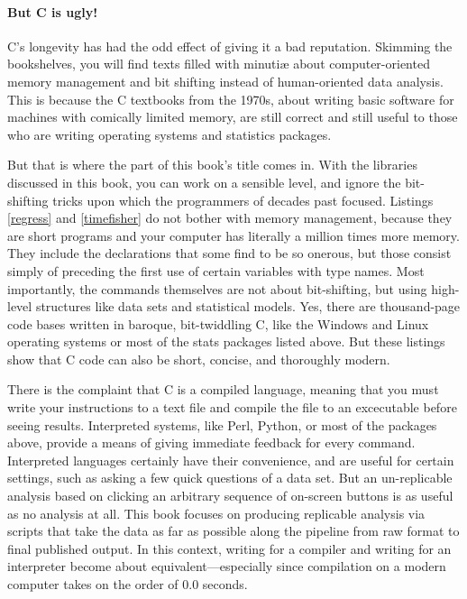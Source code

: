 \paragraph{But C is ugly!} C's longevity has had the odd effect of giving
it a bad reputation. Skimming the bookshelves, you will find texts
filled with minuti\ae{} about computer-oriented memory management and bit
shifting instead of human-oriented data analysis. This is because the
C textbooks from the 1970s, about writing basic software for machines
with comically limited memory, are still correct and still useful to
those who are writing operating systems and statistics packages.

But that is where the  part of this book's title comes
in. With the libraries discussed in this book, you can work on a sensible
level, and ignore the bit-shifting tricks upon which the programmers of
decades past focused.  Listings \ref{regress} and \ref{timefisher} do
not bother with memory management, because they are short programs and
your computer has literally a million times more memory. They include
the declarations that some find to be so onerous, but those consist
simply of preceding the first use of certain variables with type names.
Most importantly, the commands themselves are not about bit-shifting,
but using high-level structures like data sets and statistical models.
Yes, there are thousand-page code bases written in baroque, bit-twiddling
C, like the Windows and Linux operating systems or most of the stats
packages listed above. But these listings show that C code can also be
short, concise, and thoroughly modern.

There is the complaint that C is a compiled language, meaning that
you must write your instructions to a text file and compile the file
to an excecutable before seeing results. Interpreted systems,
like Perl, Python, or most of the packages above, provide a means of
giving immediate feedback for every command. Interpreted languages
certainly have their convenience, and are useful for certain settings,
such as asking a few quick questions of a data set. But an un-replicable
analysis based on clicking an arbitrary sequence of on-screen buttons
is as useful as no analysis at all.  This book focuses on producing
replicable analysis via scripts 
that take the data as far as possible along the pipeline
from raw format to final published output. In this context, writing  for
a compiler and writing  for an interpreter become about
equivalent---especially since compilation on a modern computer takes on
the order of 0.0 seconds.

